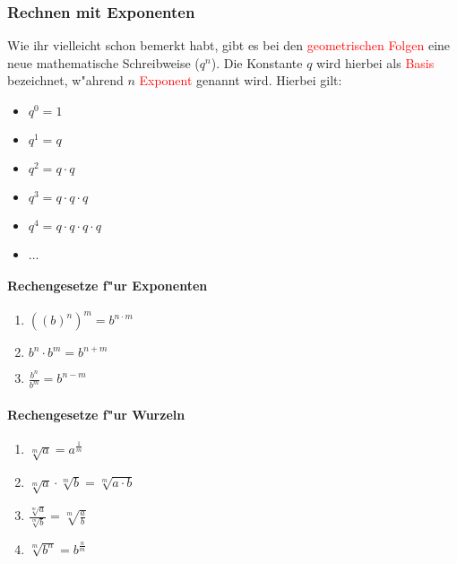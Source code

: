 \subsubsection{Rechnen mit Exponenten}
Wie ihr vielleicht schon bemerkt habt, gibt es bei den \textcolor{red}{geometrischen Folgen} eine neue mathematische Schreibweise ($q^n$). Die Konstante $q$ wird hierbei als \textcolor{red}{Basis} bezeichnet, w"ahrend $n$ \textcolor{red}{Exponent} genannt wird. Hierbei gilt:
\begin{itemize}
\item $q^0 = 1$
\item $q^1 = q$
\item $q^2 = q \cdot q$
\item $q^3 = q \cdot q \cdot q$
\item $q^4 = q \cdot q \cdot q \cdot q$
\item $\ldots$
\end{itemize}

\paragraph{Rechengesetze f"ur Exponenten}
\begin{enumerate}
\item $((b)^n)^m = b^{n \cdot m}$
\item $b^n \cdot b^m = b^{n+m}$
\item $\frac{b^n}{b^m} = b^{n-m}$
\end{enumerate}

\paragraph{Rechengesetze f"ur Wurzeln}
\begin{enumerate}
\item $\sqrt[m]{a} = a^{\frac{1}{m}}$
\item $\sqrt[m]{a} \cdot \sqrt[m]{b} = \sqrt[m]{a \cdot b}$
\item $\frac{\sqrt[m]{a}}{\sqrt[m]{b}} = \sqrt[m]{\frac{a}{b}}$
\item $\sqrt[m]{b^n} = b^{\frac{n}{m}}$
\end{enumerate}
